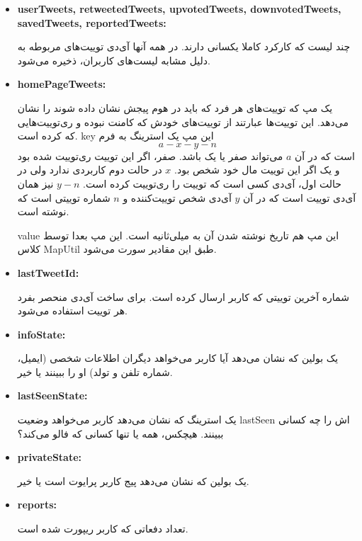 \documentclass[12pt]{article}
\begin{document}
\begin{itemize}
\item
\begin{latin}
\textbf{userTweets, retweetedTweets, upvotedTweets, downvotedTweets, savedTweets, reportedTweets:}
\end{latin}
چند لیست که کارکرد کاملا یکسانی دارند. در همه آنها آی‌دی توییت‌های مربوطه به دلیل مشابه لیست‌های کاربران، ذخیره می‌شود.

\item
\begin{latin}
\textbf{homePageTweets:}
\end{latin}
یک مپ که توییت‌های هر فرد که باید در هوم پیجش نشان داده شوند را نشان می‌دهد. این توییت‌ها عبارتند از توییت‌های خودش که کامنت نبوده و ری‌توییت‌هایی که کرده است. key این مپ یک استرینگ به فرم
$$ a-x-y-n $$
است که در آن $a$ می‌تواند صفر یا یک باشد. صفر، اگر این توییت ری‌توییت شده بود و یک اگر این توییت مال خود شخص بود. $x$ در حالت دوم کاربردی ندارد ولی در حالت اول، آی‌دی کسی است که توییت را ری‌توییت کرده است. $y-n$ نیز همان آی‌دی توییت است که در آن $y$ آی‌دی شخص توییت‌کننده و $n$ شماره توییتی است که نوشته است.

value این مپ هم تاریخ نوشته شدن آن به میلی‌ثانیه است. این مپ بعدا توسط کلاس MapUtil طبق این مقادیر سورت می‌شود.

\item
\begin{latin}
\textbf{lastTweetId:}
\end{latin}
شماره آخرین توییتی که کاربر ارسال کرده است. برای ساخت آی‌دی منحصر بفرد هر توییت استفاده می‌شود.

\item
\begin{latin}
\textbf{infoState:}
\end{latin}
یک بولین که نشان می‌دهد آیا کاربر می‌خواهد دیگران اطلاعات شخصی (ایمیل، شماره تلفن و تولد) او را ببینند یا خیر.

\item
\begin{latin}
\textbf{lastSeenState:}
\end{latin}
یک استرینگ که نشان می‌دهد کاربر می‌خواهد وضعیت lastSeen اش را چه کسانی ببینند. هیچکس، همه یا تنها کسانی که فالو می‌کند؟

\item
\begin{latin}
\textbf{privateState:}
\end{latin}
یک بولین که نشان می‌دهد پیج کاربر پرایوت است یا خیر.

\item
\begin{latin}
\textbf{reports:}
\end{latin}
تعداد دفعاتی که کاربر ریپورت شده است.


\end{itemize}
\end{document}
